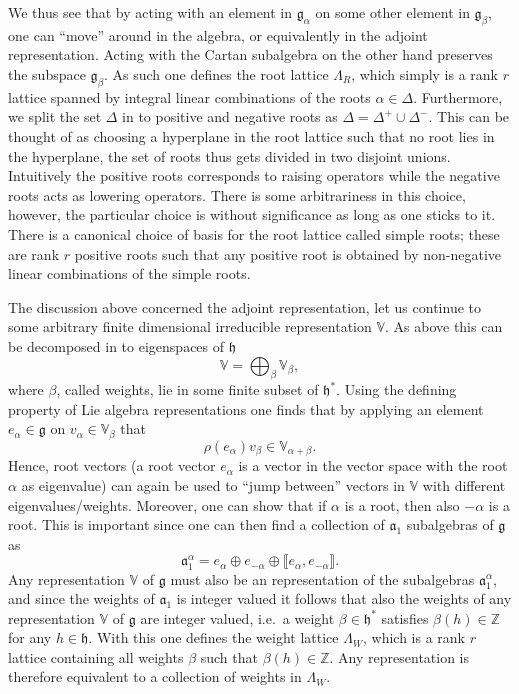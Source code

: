 We thus see that by acting with an element in $\mathfrak{g}_\alpha$ on some other element in $\mathfrak{g}_\beta$, one can ``move'' around in the algebra, or equivalently in the adjoint representation. Acting with the Cartan subalgebra on the other hand preserves the subspace $\mathfrak{g}_\beta$. As such one defines the root lattice $\Lambda_R$, which simply is a rank $r$ lattice spanned by integral linear combinations of the roots $\alpha\in\Delta$. Furthermore, we split the set $\Delta$ in to positive and negative roots as $\Delta = \Delta^+\cup\Delta^-$. This can be thought of as choosing a hyperplane in the root lattice such that no root lies in the hyperplane, the set of roots thus gets divided in two disjoint unions. Intuitively the positive roots corresponds to raising operators while the negative roots acts as lowering operators. There is some arbitrariness in this choice, however, the particular choice is without significance as long as one sticks to it. There is a canonical choice of basis for the root lattice called simple roots; these are rank $r$ positive roots such that any positive root is obtained by non-negative linear combinations of the simple roots. 

The discussion above concerned the adjoint representation, let us continue to some arbitrary finite dimensional irreducible representation $\mathbb{V}$. As above this can be decomposed in to eigenspaces of $\mathfrak{h}$
\begin{equation}
    \mathbb{V} = \bigoplus_\beta \mathbb{V}_\beta,
\end{equation}
where $\beta$, called weights, lie in some finite subset of $\mathfrak{h}^*$. Using the defining property of Lie algebra representations one finds that by applying an element $e_\alpha\in\mathfrak{g}$ on $v_\alpha\in\mathbb{V}_\beta$ that 
\begin{equation}
    \rho(e_\alpha)v_\beta \in \mathbb{V}_{\alpha+\beta}.
\end{equation}
Hence, root vectors (a root vector $e_\alpha$ is a vector in the vector space with the root $\alpha$ as eigenvalue) can again be used to ``jump between'' vectors in $\mathbb{V}$ with different eigenvalues/weights. Moreover, one can show that if $\alpha$ is a root, then also $-\alpha$ is a root. This is important since one can then find a collection of $\mathfrak{a}_1$ subalgebras of $\mathfrak{g}$ as 
\begin{equation}
    \mathfrak{a}_1^\alpha = e_\alpha \oplus e_{-\alpha} \oplus \llbracket e_\alpha,e_{-\alpha}\rrbracket.
\end{equation}
Any representation $\mathbb{V}$ of $\mathfrak{g}$ must also be an representation of the subalgebras $\mathfrak{a}_1^\alpha$, and since the weights of $\mathfrak{a}_1$ is integer valued it follows that also the weights of any representation $\mathbb{V}$ of $\mathfrak{g}$ are integer valued, i.e.\ a weight $\beta\in\mathfrak{h}^*$ satisfies $\beta(h)\in\mathbb{Z}$ for any $h\in\mathfrak{h}$. With this one defines the weight lattice $\Lambda_W$, which is a rank $r$ lattice containing all weights $\beta$ such that $\beta(h)\in\mathbb{Z}$. Any representation is therefore equivalent to a collection of weights in $\Lambda_W$. 

